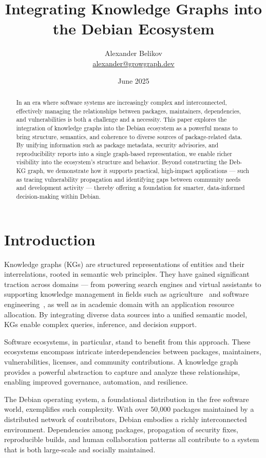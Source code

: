 \documentclass[10pt,oneside,a4paper, twocolumn]{article}
\title{Integrating Knowledge Graphs into the Debian Ecosystem}
\author{Alexander Belikov \\ \href{mailto:alexander@growgraph.dev}{alexander@growgraph.dev}}
\date{June 2025}
\begin{document}
    \maketitle

    \begin{abstract}
        In an era where software systems are increasingly complex and interconnected, effectively managing the relationships between packages, maintainers, dependencies, and vulnerabilities is both a challenge and a necessity.
        This paper explores the integration of knowledge graphs into the Debian ecosystem as a powerful means to bring structure, semantics, and coherence to diverse sources of package-related data.
        By unifying information such as package metadata, security advisories, and reproducibility reports into a single graph-based representation, we enable richer visibility into the ecosystem's structure and behavior.
        Beyond constructing the Deb-KG graph, we demonstrate how it supports practical, high-impact applications — such as tracing vulnerability propagation and identifying gaps between community needs and development activity — thereby offering a foundation for smarter, data-informed decision-making within Debian.
    \end{abstract}


    \section{Introduction}
    Knowledge graphs (KGs) are structured representations of entities and their interrelations, rooted in semantic web principles.
    They have gained significant traction across domains — from powering search engines and virtual assistants to supporting knowledge management in fields such as agriculture~\cite{Min2022-ff} and software engineering~\cite{Chen2023-pe}, as well as in academic domain with an application resource allocation\cite{xsi}.
    By integrating diverse data sources into a unified semantic model, KGs enable complex queries, inference, and decision support.

    Software ecosystems, in particular, stand to benefit from this approach.
    These ecosystems encompass intricate interdependencies between packages, maintainers, vulnerabilities, licenses, and community contributions.
    A knowledge graph provides a powerful abstraction to capture and analyze these relationships, enabling improved governance, automation, and resilience.

    The Debian operating system, a foundational distribution in the free software world, exemplifies such complexity.
    With over 50,000 packages maintained by a distributed network of contributors, Debian embodies a richly interconnected environment.
    Dependencies among packages, propagation of security fixes, reproducible builds, and human collaboration patterns all contribute to a system that is both large-scale and socially maintained.
\end{document}
